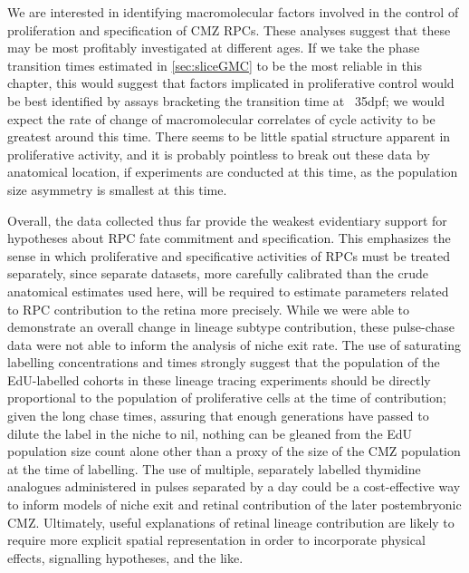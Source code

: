 We are interested in identifying macromolecular factors involved in the control of proliferation and specification of CMZ RPCs. These analyses suggest that these may be most profitably investigated at different ages. If we take the phase transition times estimated in \autoref{sec:sliceGMC} to be the most reliable in this chapter, this would suggest that factors implicated in proliferative control would be best identified by assays bracketing the transition time at ~35dpf; we would expect the rate of change of macromolecular correlates of cycle activity to be greatest around this time. There seems to be little spatial structure apparent in proliferative activity, and it is probably pointless to break out these data by anatomical location, if experiments are conducted at this time, as the population size asymmetry is smallest at this time.

Overall, the data collected thus far provide the weakest evidentiary support for hypotheses about RPC fate commitment and specification. This emphasizes the sense in which proliferative and specificative activities of RPCs must be treated separately, since separate datasets, more carefully calibrated than the crude anatomical estimates used here, will be required to estimate parameters related to RPC contribution to the retina more precisely. While we were able to demonstrate an overall change in lineage subtype contribution, these pulse-chase data were not able to inform the analysis of niche exit rate. The use of saturating labelling concentrations and times strongly suggest that the population of the EdU-labelled cohorts in these lineage tracing experiments should be directly proportional to the population of proliferative cells at the time of contribution; given the long chase times, assuring that enough generations have passed to dilute the label in the niche to nil, nothing can be gleaned from the EdU population size count alone other than a proxy of the size of the CMZ population at the time of labelling. The use of multiple, separately labelled thymidine analogues administered in pulses separated by a day could be a cost-effective way to inform models of niche exit and retinal contribution of the later postembryonic CMZ. Ultimately, useful explanations of retinal lineage contribution are likely to require more explicit spatial representation in order to incorporate physical effects, signalling hypotheses, and the like.

